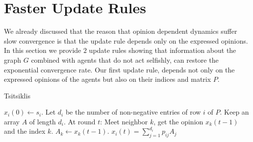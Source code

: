 \section{Faster Update Rules}\label{s:graph_aware}

We already discussed that the reason that opinion dependent dynamics suffer slow
convergence is that the update rule depends only on the expressed opinions.
In this section we provide $2$ update rules showing that information about the
graph $G$ combined with agents that do not act selfishly,
can restore the exponential convergence rate.
Our first update rule, depends not only on the expressed opinions of the
agents but also on their indices and matrix $P$.
\begin{algorithm}
  \caption{Tsitsiklis}
  \label{alg:tsitsiklis}
  \begin{algorithmic}[1]
    \STATE $x_i(0) \gets s_i$.
    \STATE Let $d_i$ be the number of non-negative entries of row $i$ of $P$.
    \STATE Keep an array $A$ of length $d_i$.
    \STATE At round $t$:
    \bindent
    \STATE Meet neighbor $k$, get the opinion $x_k(t-1)$ and the index $k$.
    \STATE $A_k \gets x_k(t-1)$.
    \STATE $x_i(t) = \sum_{j=1}^{d_i} p_{ij} A_j$
    \eindent
\end{algorithmic}
\end{algorithm}

